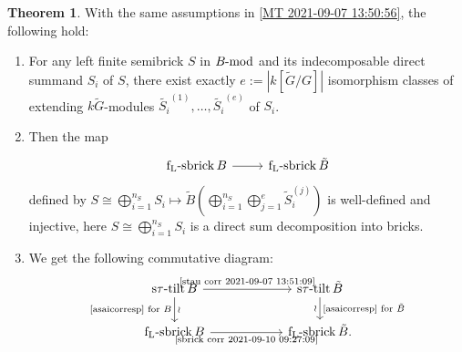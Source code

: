 \documentclass[pdftex,a4paper]{article}
\numberwithin{equation}{subsection}
\theoremstyle{definition}
\newtheorem{theorem}{Theorem}[section]
\newcommand{\lmod}{\operatorname{\mathrm{\hspace{-2pt}-mod}}}
\newcommand{\stautilt}{\operatorname{\mathrm{s\tau-tilt}}}
\newcommand{\flsbrick}{\operatorname{\mathrm{f_L-sbrick}}}
\begin{document}
\begin{theorem}\label{MT sbrick 2021-09-10 09:27:04}
	With the same assumptions in \cref{MT 2021-09-07 13:50:56}, the following hold:
	\begin{enumerate}
		\item For any left finite semibrick \(S\) in \(B\lmod\) and its indecomposable direct summand \(S_i\) of \(S\), there exist exactly \(e:=|k[\tilde{G}/G]|\) isomorphism classes of extending \(k\tilde{G}\)-modules \(\tilde{S_i}^{(1)}, \ldots, \tilde{S_i}^{(e)}\) of \(S_i\).
		\item Then the map
		      \begin{equation}\label{sbrick corr 2021-09-10 09:27:09}
			      \begin{tikzcd}[ampersand replacement=\&,row sep=1pt]
				      \flsbrick B \ar[r]\&\flsbrick \tilde{B}\\
			      \end{tikzcd}
		      \end{equation}
		      defined by \(S\cong \bigoplus_{i=1}^{n_{S}}S_i\mapsto \tilde{B}\left( \bigoplus_{i=1}^{n_S}\bigoplus_{j=1}^{e}\tilde{S}_i^{(j)} \right)\) is well-defined and injective, here \(S\cong \bigoplus_{i=1}^{n_{S}}S_i\) is a direct sum decomposition into bricks.
		\item We get the following  commutative diagram:
		      \begin{equation}
			      \begin{tikzcd}[ampersand replacement=\&, column sep=2cm]
				      \stautilt B\ar[d,"\text{\eqref{asaicorresp} for \(B\)}"',"\wr"] \ar[r,"\text{\eqref{stau corr 2021-09-07 13:51:09}}"]\&\stautilt \tilde{B} \ar[d,"\text{\eqref{asaicorresp} for \(\tilde{B}\)}","\wr"']\\
				      \flsbrick B\ar[r,"\text{\eqref{sbrick corr 2021-09-10 09:27:09}}"']\&\flsbrick \tilde{B}.
			      \end{tikzcd}
		      \end{equation}\label{cmuutative diangram 2021-09-10 09:50:21}
	\end{enumerate}
\end{theorem}
\end{document}
